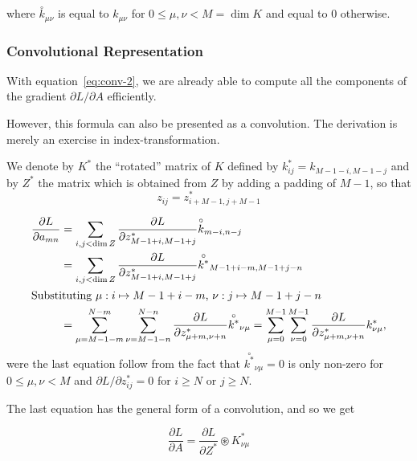 \documentclass[a4paper,10pt]{article}
\begin{document}
where $\overset{\circ}{k}_{\mu \nu}$ is equal to 
$k_{\mu \nu}$ for $0 \le \mu, \nu < M = \dim K$ and equal 
to $0$ otherwise.

\subsubsection*{Convolutional Representation}

With equation~\ref{eq:conv-2}, we are already able to compute 
all the components of the gradient $\partial L / \partial A$ efficiently.

However, this formula can also be presented as a convolution. 
The derivation is merely an exercise in index-transformation.   

We denote by $K^*$ the ``rotated'' matrix of $K$ defined by 
$k^*_{ij} = k_{M-1-i, M-1-j}$ and by $Z^*$ the matrix which is obtained from $Z$ by 
adding a padding of $M-1$, so that 
\[
    z_{ij} = z^*_{i+M-1, j+M-1}
\]

\begin{align*}
    \frac{\partial L}{\partial a_{mn}} &= 
    \sum_{i,j < \dim Z}
    \frac{\partial L}{\partial z^*_{M-1+i,M-1+j}} \overset{\circ}{k}_{m-i, n-j} \\
    &= \sum_{i,j < \dim Z}
    \frac{\partial L}{\partial z^*_{M-1+i, M-1+j}}
    \overset{\circ}{k^*}_{M-1+i-m, M-1+j-n} \\
    \intertext{Substituting $\mu:  i\mapsto M-1+i-m$, $\nu: j \mapsto M-1+j-n$} 
    &= \sum_{\mu = M-1-m}^{N-m} \sum_{\nu = M-1-n}^{N-n} 
    \frac{\partial L}{\partial z^*_{\mu + m, \nu + n}} \overset{\circ}{k^*}_{\nu \mu} = 
    \sum_{\mu = 0}^{M-1}\sum_{\nu = 0}^{M-1} 
    \frac{\partial L}{\partial z^*_{\mu + m, \nu + n}} k^*_{\nu \mu},
\end{align*}
were the last equation follow from the fact that 
$\overset{\circ}{k^*}_{\nu \mu} = 0$ is only non-zero for $0\le \mu, \nu < M$ and 
$\partial L / \partial z^*_{ij} =0$ for $i \ge N$ or $j \ge N$. 

The last equation has the general form of a convolution, and so we get

\begin{equation}
    \boxed{
    \frac{\partial L}{\partial A} = \frac{\partial L}{\partial Z^*} \circledast K^*_{\nu \mu}
    }
\end{equation}
\end{document}
